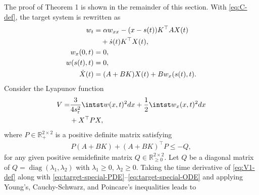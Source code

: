 \documentclass[letterpaper, 10 pt, conference]{cls/ieeeconf}
\DeclareMathOperator*{\diag}{diag}
\theoremstyle{definition}
\newcommand{\bbR}{\mathbb{R}}
\begin{document}
The proof of Theorem 1 is shown in the remainder of this section. 
With \eqref{eq:C-def}, the target system is rewritten as  
\begin{align} \label{eq:target-special-PDE}
    w_t &= \alpha w_{xx} - (x - s(t)) K^\top A X(t) \notag\\
    & \quad + \dot s(t) K^\top X(t), \\
 \label{eq:target-special-BC1} w_x(0,t) & = 0 , \\
 \label{eq:target-special-BC2}   w(s(t),t) & = 0, \\
 \label{eq:target-special-ODE}   \dot X(t) & = (A + BK) X(t) + B w_x(s(t),t). 
\end{align} 
Consider the Lyapunov function 
\begin{align}\label{eq:V1-def}
    V =&  \frac{3}{4 s_{\rm r}^2} \intst w(x,t)^2 dx  + \frac{1}{2} \intst w_x(x,t)^2 dx \notag\\
    & +  X^\top P X ,  
\end{align}
where $P \in \bbR^{2 \times 2}_+$ is a positive definite matrix satisfying 
\begin{align} \label{eq:Lyapunov}
    P(A + BK)  + (A + BK)^\top P \leq - Q, 
\end{align}
for any given positive semidefinite matrix $Q \in \bbR^{2 \times 2}_{\geq 0}$. Let $Q$ be a diagonal matrix of $Q = \diag(\lambda_1, \lambda_2)$ with $\lambda_1 \geq 0$, $\lambda_2 \geq 0$. 
Taking the time derivative of \eqref{eq:V1-def} along with \eqref{eq:target-special-PDE}--\eqref{eq:target-special-ODE} and applying Young's, Cauchy-Schwarz, and Poincare's inequalities leads to 
\end{document}
